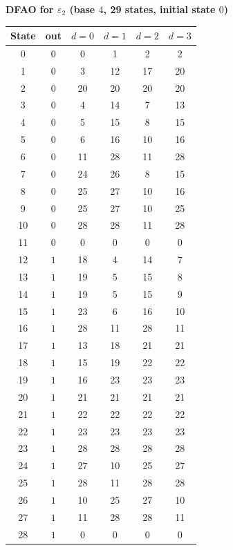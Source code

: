 \documentclass[12pt]{article}
\theoremstyle{definition}
\theoremstyle{remark}
\begin{document}
\noindent\begin{minipage}{\linewidth}
\textbf{DFAO for $\varepsilon_2$ (base $4$, 29 states, initial state $0$)}

\begin{center}
\renewcommand{\arraystretch}{1.1}
\begin{tabular}{c|c|cccc}
State & out & $d=0$ & $d=1$ & $d=2$ & $d=3$ \\\hline
0 & $0$ & 0 & 1 & 2 & 2 \\
1 & $0$ & 3 & 12 & 17 & 20 \\
2 & $0$ & 20 & 20 & 20 & 20 \\
3 & $0$ & 4 & 14 & 7 & 13 \\
4 & $0$ & 5 & 15 & 8 & 15 \\
5 & $0$ & 6 & 16 & 10 & 16 \\
6 & $0$ & 11 & 28 & 11 & 28 \\
7 & $0$ & 24 & 26 & 8 & 15 \\
8 & $0$ & 25 & 27 & 10 & 16 \\
9 & $0$ & 25 & 27 & 10 & 25 \\
10 & $0$ & 28 & 28 & 11 & 28 \\
11 & $0$ & 0 & 0 & 0 & 0 \\
12 & $1$ & 18 & 4 & 14 & 7 \\
13 & $1$ & 19 & 5 & 15 & 8 \\
14 & $1$ & 19 & 5 & 15 & 9 \\
15 & $1$ & 23 & 6 & 16 & 10 \\
16 & $1$ & 28 & 11 & 28 & 11 \\
17 & $1$ & 13 & 18 & 21 & 21 \\
18 & $1$ & 15 & 19 & 22 & 22 \\
19 & $1$ & 16 & 23 & 23 & 23 \\
20 & $1$ & 21 & 21 & 21 & 21 \\
21 & $1$ & 22 & 22 & 22 & 22 \\
22 & $1$ & 23 & 23 & 23 & 23 \\
23 & $1$ & 28 & 28 & 28 & 28 \\
24 & $1$ & 27 & 10 & 25 & 27 \\
25 & $1$ & 28 & 11 & 28 & 28 \\
26 & $1$ & 10 & 25 & 27 & 10 \\
27 & $1$ & 11 & 28 & 28 & 11 \\
28 & $1$ & 0 & 0 & 0 & 0 \\
\end{tabular}
\end{center}
\end{minipage}
\bigskip
\end{document}

